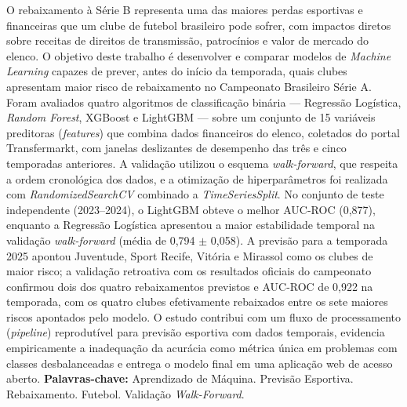 \documentclass[
    article,
    12pt,
    oneside,
    a4paper,
    english,
    brazilian
    ]{abntex2}
\begin{document}
\begin{resumo}
\noindent O rebaixamento à Série B representa uma das maiores perdas esportivas e financeiras que um clube de futebol brasileiro pode sofrer, com impactos diretos sobre receitas de direitos de transmissão, patrocínios e valor de mercado do elenco. O objetivo deste trabalho é desenvolver e comparar modelos de \textit{Machine Learning} capazes de prever, antes do início da temporada, quais clubes apresentam maior risco de rebaixamento no Campeonato Brasileiro Série A. Foram avaliados quatro algoritmos de classificação binária --- Regressão Logística, \textit{Random Forest}, XGBoost e LightGBM --- sobre um conjunto de 15 variáveis preditoras (\textit{features}) que combina dados financeiros do elenco, coletados do portal Transfermarkt, com janelas deslizantes de desempenho das três e cinco temporadas anteriores. A validação utilizou o esquema \textit{walk-forward}, que respeita a ordem cronológica dos dados, e a otimização de hiperparâmetros foi realizada com \textit{RandomizedSearchCV} combinado a \textit{TimeSeriesSplit}. No conjunto de teste independente (2023--2024), o LightGBM obteve o melhor AUC-ROC (0,877), enquanto a Regressão Logística apresentou a maior estabilidade temporal na validação \textit{walk-forward} (média de 0,794 $\pm$ 0,058). A previsão para a temporada 2025 apontou Juventude, Sport Recife, Vitória e Mirassol como os clubes de maior risco; a validação retroativa com os resultados oficiais do campeonato confirmou dois dos quatro rebaixamentos previstos e AUC-ROC de 0,922 na temporada, com os quatro clubes efetivamente rebaixados entre os sete maiores riscos apontados pelo modelo. O estudo contribui com um fluxo de processamento (\textit{pipeline}) reprodutível para previsão esportiva com dados temporais, evidencia empiricamente a inadequação da acurácia como métrica única em problemas com classes desbalanceadas e entrega o modelo final em uma aplicação web de acesso aberto.
\newline
\noindent \textbf{Palavras-chave:} Aprendizado de Máquina. Previsão Esportiva. Rebaixamento. Futebol. Validação \textit{Walk-Forward}.
\end{resumo}
\newpage
\end{document}
